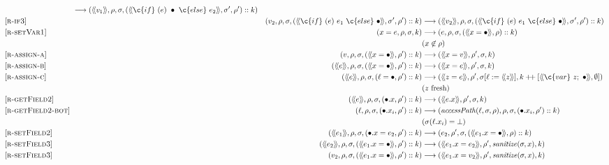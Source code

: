 \begin{figure*}
\begin{center}
\begin{align*}
    & \longrightarrow
    (\residual{v_1}, \rho, \sigma, (\residual{\c{if}~(e)~\bullet~\c{else}~e_2}, \sigma', \rho')::k)
\\
  \omit [\textsc{r-if3}] &&
    (v_2, \rho, \sigma, (\residual{\c{if}~(e)~e_1~\c{else}~\bullet}, \sigma', \rho')::k)
    & \longrightarrow
    (\residual{v_2}, \rho, \sigma, (\residual{\c{if}~(e)~e_1~\c{else}~\bullet}, \sigma', \rho')::k)
\\
  \omit [\textsc{r-setVar1}] &&
    (x = e, \rho, \sigma, k)
    & \longrightarrow
    (e, \rho, \sigma, (\residual{x = \bullet}, \rho)::k)
        \\ &&& (x \not\in \rho)
\\
  \omit [\textsc{r-assign-a}] &&
    (v, \rho, \sigma, (\residual{x = \bullet}, \rho')::k)
    & \longrightarrow
    (\residual{x = v}, \rho', \sigma, k)
\\
  \omit [\textsc{r-assign-b}] &&
    (\residual{e}, \rho, \sigma, (\residual{x = \bullet}, \rho')::k)
    & \longrightarrow
    (\residual{x = e}, \rho', \sigma, k)
\\
  \omit [\textsc{r-assign-c}] &&
    (\residual{e}, \rho, \sigma, (\ell = \bullet, \rho')::k)
    & \longrightarrow
    (\residual{z = e}, \rho', \sigma[\ell := \residual{z}], k \mathbin{+\!+}
    [\residual{\c{var}~z;~\bullet}, \emptyset])
        \\ &&& (z~\mbox{fresh})
\\
  \omit [\textsc{r-getField2}] &&
    (\residual{e}, \rho, \sigma, (\bullet.x, \rho')::k)
    & \longrightarrow
    (\residual{e.x}, \rho', \sigma, k)
\\
  \omit [\textsc{r-getField2-bot}] &&
    (\ell, \rho, \sigma, (\bullet.x_i, \rho')::k)
    & \longrightarrow
    (\mathit{accessPath}(\ell, \sigma, \rho), \rho, \sigma, (\bullet.x_i, \rho')::k)
        \\ &&& (\sigma(\ell.x_i) = \bot)
\\
  \omit [\textsc{r-setField2}] &&
    (\residual{e_1}, \rho, \sigma, (\bullet.x = e_2, \rho')::k)
    & \longrightarrow
    (e_2, \rho', \sigma, (\residual{e_1.x = \bullet}, \rho)::k)
\\
  \omit [\textsc{r-setField3}] &&
    (\residual{e_2}, \rho, \sigma, (\residual{e_1.x = \bullet}, \rho')::k)
    & \longrightarrow
    (\residual{e_1.x = e_2}, \rho', \mathit{sanitize}(\sigma, x), k)
\\
  \omit [\textsc{r-setField3}] &&
    (v_2, \rho, \sigma, (\residual{e_1.x = \bullet}, \rho')::k)
    & \longrightarrow
    (\residual{e_1.x = v_2}, \rho', \mathit{sanitize}(\sigma, x), k)

\end{align*}
\end{center}
\end{figure*}
